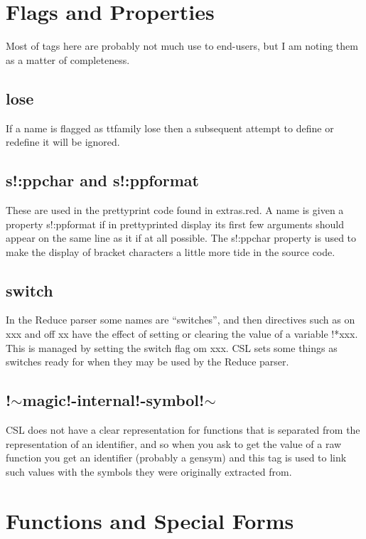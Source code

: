 \documentclass[a4paper,11pt]{article}
\begin{document}
{\section{Flags and Properties}
  
   Most of tags here are probably not much use to end-users, but I am noting them
   as a matter of completeness.
  

\subsection{\ttfamily lose}
   If a name is flagged as {ttfamily lose} then a subsequent attempt to
   define or redefine it will be ignored.

\subsection{\ttfamily s!:ppchar and s!:ppformat}
   These are used in the prettyprint code found in {\ttfamily extras.red}. A
   name is given a property {\ttfamily s!:ppformat} if in prettyprinted display
   its first few arguments should appear on the same line as it if at all
   possible. The {\ttfamily s!:ppchar} property is used to make the display of
   bracket characters a little more tide in the source code.

\subsection{\ttfamily switch}
   In the Reduce parser some names are ``switches'', and then directives such
   as {\ttfamily on xxx} and {\ttfamily off xx} have the effect of setting or
   clearing the value of a variable {\ttfamily !*xxx}. This is managed by
   setting the {\ttfamily switch} flag om {\ttfamily xxx}. CSL sets some
   things as switches ready for when they may be used by the Reduce parser.

\subsection{\ttfamily !$\sim$magic!-internal!-symbol!$\sim$}
   CSL does not have a clear representation for functions that is separated from
   the representation of an identifier, and so when you ask to get the value
   of a raw function you get an identifier (probably a gensym) and this
   tag is used to link such values with the symbols they were originally
   extracted from.

\section{Functions and Special Forms}
  
}
\end{document}
